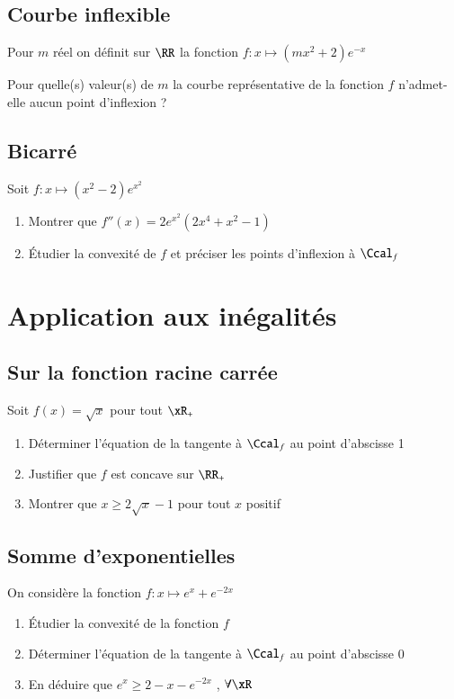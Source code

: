 \documentclass[oneside,12pt]{article}          %
\begin{document}
\subsection{Courbe inflexible}
Pour $m$ réel on définit sur $\RR$ la fonction $f:x\mapsto(mx^2+2)e^{-x}$

Pour quelle(s) valeur(s) de $m$ la courbe représentative de la fonction $f$ n'admet-elle aucun point d'inflexion ?



\subsection{Bicarré}
Soit $ f : x \mapsto (x^2-2) e^{x^2} $
\begin{enumerate}
    \item Montrer que $ f''(x) = 2e^{x^2} (2x^4 + x^2 - 1) $
    \item Étudier la convexité de $f$ et préciser les points d'inflexion à $\Ccal_f$
\end{enumerate}



\section{Application aux inégalités}

\subsection{Sur la fonction racine carrée}
Soit $f(x)=\sqrt{x}$ pour tout $\xR_+$

\begin{enumerate}
	\item Déterminer l'équation de la tangente à $\Ccal_f$ au point d'abscisse 1
	\item Justifier que $f$ est concave sur $\RR_+$
	\item Montrer que $x\geq2\sqrt{x}-1$ pour tout $x$ positif
\end{enumerate}



\subsection{Somme d'exponentielles}
On considère la fonction $f:x\mapsto e^x+e^{-2x}$
\begin{enumerate}
    \item Étudier la convexité de la fonction $f$
    \item Déterminer l'équation de la tangente à $\Ccal_f$ au point d'abscisse 0
    \item En déduire que $e^x\geq2-x-e^{-2x}$ , $\forall \xR$
\end{enumerate}
\end{document}
